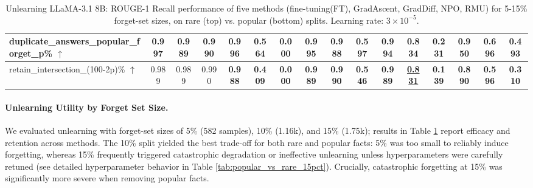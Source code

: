\begin{table}[t]
{\begin{tabular}{|l|c|c|c|c|c|c|c|c|c|c|c|c|c|c|c|}
\hline
duplicate\_answers\_popular\_forget\_p\% $\uparrow$
  & 0.997 & 0.989 & 0.990 
  & 0.996 & 0.564 & 0.000 
  & 0.995 & 0.988 & 0.597 
  & 0.994 & 0.834 & 0.231 
  & 0.950 & 0.696 & 0.493 \\
\hline
retain\_intersection\_{(100-2p)\%} $\uparrow$
  & 0.989 & 0.989 & 0.990 
  & \textbf{0.988} & \textbf{0.409} & \textbf{0.000} 
  & \textbf{0.989} & \textbf{0.990} & \textbf{0.546} 
  & \textbf{0.989} & \textbf{\underline{0.831}} & \textbf{0.139} 
  & \textbf{0.890} & \textbf{0.596} & \textbf{0.310} \\
\hline
\end{tabular}
}
\caption{Unlearning LLaMA-3.1 8B: ROUGE-1 Recall performance of five methods (fine-tuning(FT), GradAscent, GradDiff, NPO, RMU) for 5-15\% forget-set sizes, on rare (top) vs. popular (bottom) splits. Learning rate: $3 \times 10^{-5}$.}
\label{tab:split_comparison}
\end{table}





\paragraph{Unlearning Utility by Forget Set Size.}
We evaluated unlearning with forget-set sizes of 5\% (582 samples), 10\% (1.16k), and 15\% (1.75k); results in Table \ref{tab:split_comparison} report efficacy and retention across methods. The 10\% split yielded the best trade-off for both rare and popular facts: 5\% was too small to reliably induce forgetting, whereas 15\% frequently triggered catastrophic degradation or ineffective unlearning unless hyperparameters were carefully retuned (see detailed hyperparameter behavior in Table \ref{tab:popular_vs_rare_15pct}). Crucially, catastrophic forgetting at 15\% was significantly more severe when removing popular facts.


